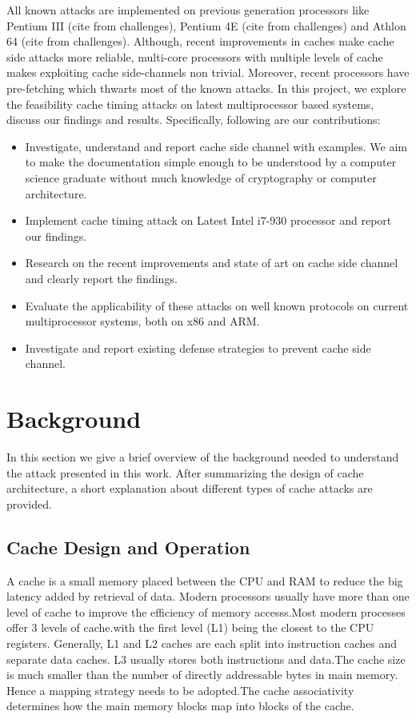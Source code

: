 \documentclass[twocolumn]{IEEEtran}
\begin{document}
All known attacks are implemented on previous generation processors like Pentium III (cite from challenges), Pentium 4E (cite from challenges) and Athlon 64 (cite from challenges). Although, recent improvements in caches make cache side attacks more reliable, multi-core processors with multiple levels of cache makes exploiting cache side-channels non trivial. Moreover, recent processors have pre-fetching\cite{tse1998cpu} which thwarts most of the known attacks. In this project, we explore the feasibility cache timing attacks on latest multiprocessor based systems, discuss our findings and results. Specifically, following are our contributions:
\begin{itemize}
\item Investigate, understand and report cache side channel with examples. We aim to make the documentation simple enough to be understood by a computer science graduate without much knowledge of cryptography or computer architecture.
\item Implement cache timing attack on Latest Intel i7-930 processor and report our findings.
\item Research on the recent improvements and state of art on cache side channel and clearly report the findings.
\item Evaluate the applicability of these attacks on well known protocols on current multiprocessor systems, both on x86 and ARM.
\item Investigate and report existing defense strategies to prevent cache side channel.
\end{itemize}


\section {Background}

In this section we give a brief overview of the background needed to understand the attack presented in this work. After summarizing the design of cache architecture, a short explanation about different types of cache attacks are provided.

\subsection {Cache Design and Operation}

A cache is a small memory placed between the CPU and RAM to reduce the big latency added by retrieval of data. Modern processors usually have more than one level of cache to improve the efficiency of memory accesss.Most modern processes offer 3 levels of cache.with the first level (L1) being the closest to the CPU registers. Generally, L1 and L2 caches are each split into instruction caches and separate data caches. L3 usually stores both instructions and data.The cache size is much smaller than the number of directly addressable bytes in main memory. Hence a mapping strategy needs to be adopted.The cache associativity determines how the main memory blocks map into blocks of the cache.
\end{document}
